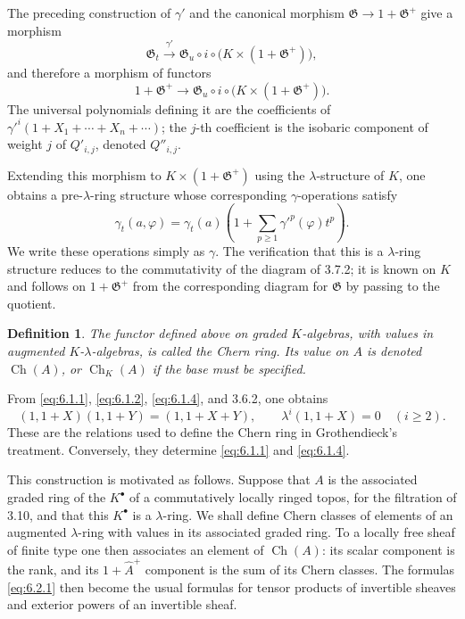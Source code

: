 \documentclass[13pt]{extarticle}
\newcommand{\Go}{\mathfrak G}
\newcommand{\Got}{\mathfrak G_t}
\newcommand{\Gou}{\mathfrak G_u}
\newcommand{\Ch}{\operatorname{Ch}}
\newtheorem*{definition}{Definition}
\begin{document}
The preceding construction of $\gamma'$ and the canonical morphism $\Go\to 1+\Go^+$ give a morphism
\[
\Got\xrightarrow{\gamma'}\Gou\circ i\circ\bigl(K\times(1+\Go^+)\bigr),
\]
and therefore a morphism of functors
\[
1+\Go^+\longrightarrow\Gou\circ i\circ\bigl(K\times(1+\Go^+)\bigr).
\]
The universal polynomials defining it are the coefficients of $\gamma'^i(1+X_1+\cdots+X_n+\cdots)$; the $j$-th coefficient is the isobaric component of weight $j$ of $Q'_{i,j}$, denoted $Q''_{i,j}$.

Extending this morphism to $K\times(1+\Go^+)$ using the $\lambda$-structure of $K$, one obtains a pre-$\lambda$-ring structure whose corresponding $\gamma$-operations satisfy
\begin{equation}\label{eq:6.1.4}
\gamma_t(a,\varphi)=\gamma_t(a)\left(1+\sum_{p\geq 1}\gamma'^p(\varphi)t^p\right).
\end{equation}
We write these operations simply as $\gamma$. The verification that this is a $\lambda$-ring structure reduces to the commutativity of the diagram of 3.7.2; it is known on $K$ and follows on $1+\Go^+$ from the corresponding diagram for $\Go$ by passing to the quotient.

\begin{definition}
The functor defined above on graded $K$-algebras, with values in augmented $K$-$\lambda$-algebras, is called the \emph{Chern ring}. Its value on $A$ is denoted $\Ch(A)$, or $\Ch_K(A)$ if the base must be specified.
\end{definition}

From \eqref{eq:6.1.1}, \eqref{eq:6.1.2}, \eqref{eq:6.1.4}, and 3.6.2, one obtains
\begin{equation}\label{eq:6.2.1}
(1,1+X)(1,1+Y)=(1,1+X+Y),
\qquad
\lambda^i(1,1+X)=0\quad(i\geq 2).
\end{equation}
These are the relations used to define the Chern ring in Grothendieck's treatment. Conversely, they determine \eqref{eq:6.1.1} and \eqref{eq:6.1.4}.

This construction is motivated as follows. Suppose that $A$ is the associated graded ring of the $K^{\bullet}$ of a commutatively locally ringed topos, for the filtration of 3.10, and that this $K^{\bullet}$ is a $\lambda$-ring. We shall define Chern classes of elements of an augmented $\lambda$-ring with values in its associated graded ring. To a locally free sheaf of finite type one then associates an element of $\Ch(A)$: its scalar component is the rank, and its $1+\widehat A^+$ component is the sum of its Chern classes. The formulas \eqref{eq:6.2.1} then become the usual formulas for tensor products of invertible sheaves and exterior powers of an invertible sheaf.
\end{document}
